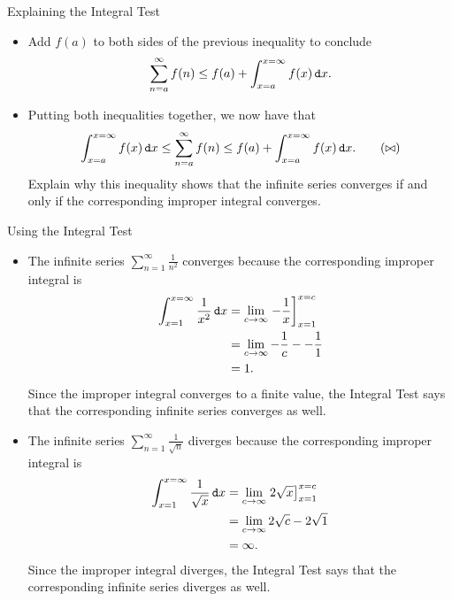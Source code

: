 \begin{exercise}{Explaining the Integral Test \Coffeecup \Coffeecup \Coffeecup}
\begin{itemize}
\vspace*{1in}
\item Add $f(a)$ to both sides of the previous inequality to conclude $$ \sum_{n=a}^\infty f(n)\leq  f(a)+\int_{x=a}^{x=\infty} f(x)\mathop{}\!\mathtt{d} x.  $$

\vspace*{.5in}

\item Putting both inequalities together, we now have that \begin{align*}
\int_{x=a}^{x=\infty} f(x)\mathop{}\!\mathtt{d} x \leq \sum_{n=a}^\infty f(n)\leq  f(a)+\int_{x=a}^{x=\infty} f(x)\mathop{}\!\mathtt{d} x. \tag{$\bowtie $}
\end{align*} 
Explain why this inequality shows that the infinite series converges if and only if the corresponding improper integral converges.

\vspace*{.5in}

\end{itemize}
\end{exercise}

\begin{example}{Using the Integral Test}\label{UsingIntTest}
\begin{itemize}
\item The infinite series $\sum_{n=1}^\infty \frac{1}{n^2}$ converges because the corresponding improper integral is \begin{align*}
\int_{x=1}^{x=\infty}\frac{1}{x^2}\mathop{}\!\mathtt{d} x &=\lim_{c\to\infty}\left.-\frac{1}{x}\right]_{x=1}^{x=c}\\
&=\lim_{c\to\infty}-\frac{1}{c}--\frac{1}{1}\\
&=1.
\end{align*}  Since the improper integral converges to a finite value, the Integral Test says that the corresponding infinite series converges as well.
\item The infinite series $\sum_{n=1}^\infty \frac{1}{\sqrt{n}}$ diverges because the corresponding improper integral is \begin{align*}
\int_{x=1}^{x=\infty}\frac{1}{\sqrt{x}}\mathop{}\!\mathtt{d} x &=\lim_{c\to\infty}\left.2\sqrt{x}\right]_{x=1}^{x=c}\\
&=\lim_{c\to\infty}2\sqrt{c}-2\sqrt{1}\\
&=\infty.
\end{align*}  Since the improper integral diverges, the Integral Test says that the corresponding infinite series diverges as well.
\end{itemize}
\end{example}

